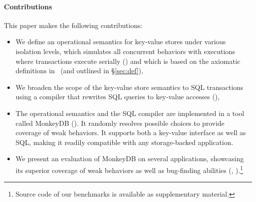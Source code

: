 \paragraph{Contributions}

This paper makes the following contributions:
\begin{itemize}
\item We define an operational semantics for key-value stores under various
  isolation levels, which simulates all concurrent behaviors with executions
  where transactions execute serially () and which is based 
  on the axiomatic definitions in~\cite{DBLP:journals/pacmpl/BiswasE19} (and outlined in \S\ref{sec:def}),
\item We broaden the scope of the key-value store semantics to SQL transactions
  using a compiler that rewrites SQL queries to key-value accesses (),
\item The operational semantics and the SQL compiler are implemented in a tool
  called MonkeyDB (). It randomly resolves possible choices to provide coverage
  of weak behaviors. It supports both a key-value interface as well as SQL,
  making it readily compatible with any storage-backed application.
\item We present an evaluation of MonkeyDB on several applications, showcasing
its superior coverage of weak behaviors as well as bug-finding abilities
(, ).\footnote{Source code of our benchmarks is available
as supplementary material.}
\end{itemize}



 


 




